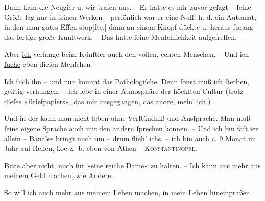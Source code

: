 \pstart
           Dann kam die Neugier u. wir trafen uns. – Er hatte es mir zuvor geſagt –{ }ſeine Größe
               lag nur in{ }ſeinen Werken – perſönlich war er eine Null! {\pb}h. d. ein Automat, in den man gutes Eſſen
                  stop{[}fte,{]} dann an einem Knopf dückte u. heraus{ }ſprang das
               fertige große Kunſtwerk. – Das hatte{ }ſeine Menſchlichkeit aufgefreſſen. –\pend
           
\pstart
           Aber \uline{ich} verlange beim Künſtler auch den vollen,
               echten Menschen. – Und ich \uline{ſuche} eben dieſen Menſchen
               – \label{K_L04551-5v}\label{K_L04551-5}\pend
           
\pstart
           Ich{ }ſuch ihn – und nun kommt das Pathologiſche. Denn{ }ſonst muß ich{ }ſterben, geiſtig
               verhungen. – Ich lebe in einer Atmosphäre der höchſten Cultur (trotz dieſes
               »Briefpapiers«, das mir ausgegangen, das andre, mein’ ich.)\pend
           
\pstart
           Und in der kann man nicht leben ohne Verſtändniß und Ausſprache. Man muß{ }ſeine eigene
               Sprache auch mit den andern{ }ſprechen können. – Und ich bin faſt i{\geminationm}er allein – Banales bringt mich um – drum flieh’ ichs.
               – ich bin auch c. 9 Monat im Jahr auf Reiſen, ko{\geminationm}e z. b.
               eben von Athen – \textsc{Konstantinopel}.\pend
           
\pstart
           Bitte aber nicht, mich für »eine reiche Dame« zu halten. – Ich kann aus \uline{mehr} aus meinem Geld machen, wie Andere.\pend
           
\pstart
           So will ich auch mehr aus meinem Leben machen, in mein Leben hineinpraßen.\pend
           
